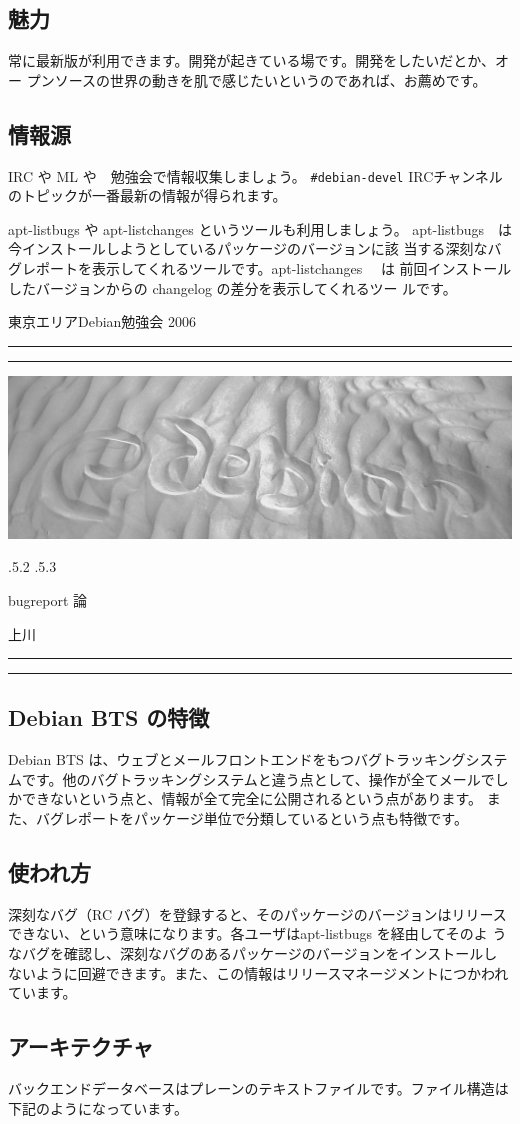 \documentclass[mingoth,a4paper]{jsarticle}
\makeatletter
\renewcommand{\section}{\@startsection{section}{1}{\z@}%
    {\Cvs \@plus.5\Cdp \@minus.2\Cdp}%
    {.5\Cvs \@plus.3\Cdp}%
    {\normalfont\Huge\headfont\raggedright\centering}} %
\newcommand{\dancersection}[2]{%
\newpage
東京エリアDebian勉強会 2006
\hrule
\vspace{0.5mm}
\hrule
\hfill{}\includegraphics[width=16cm]{image2006-natsu/guruguru-sand-light.png}\\
\vspace{-5cm}
\begin{center}
\section{#1}
\end{center}
\hfill{}\colorbox{white}{#2}\hspace{3cm}\space\\
\vspace{1cm}
\hrule
\vspace{0.5mm}
\hrule
\vspace{1cm}
}
\makeatother
\begin{document}
\subsection{魅力}

常に最新版が利用できます。開発が起きている場です。開発をしたいだとか、オー
プンソースの世界の動きを肌で感じたいというのであれば、お薦めです。

\subsection{情報源}

IRC や ML や　勉強会で情報収集しましょう。
\verb!#debian-devel! IRCチャンネルのトピックが一番最新の情報が得られます。

apt-listbugs や apt-listchanges というツールも利用しましょう。
apt-listbugs　は今インストールしようとしているパッケージのバージョンに該
当する深刻なバグレポートを表示してくれるツールです。apt-listchanges 　は
前回インストールしたバージョンからの changelog の差分を表示してくれるツー
ルです。

\dancersection{bugreport 論}{上川}

\subsection{Debian BTS の特徴}

Debian BTS は、ウェブとメールフロントエンドをもつバグトラッキングシステ
ムです。他のバグトラッキングシステムと違う点として、操作が全てメールでし
かできないという点と、情報が全て完全に公開されるという点があります。
また、バグレポートをパッケージ単位で分類しているという点も特徴です。

\subsection{使われ方}

深刻なバグ（RC バグ）を登録すると、そのパッケージのバージョンはリリース
できない、という意味になります。各ユーザはapt-listbugs を経由してそのよ
うなバグを確認し、深刻なバグのあるパッケージのバージョンをインストールし
ないように回避できます。また、この情報はリリースマネージメントにつかわれ
ています。

\subsection{アーキテクチャ}

バックエンドデータベースはプレーンのテキストファイルです。ファイル構造は
下記のようになっています。
\end{document}
